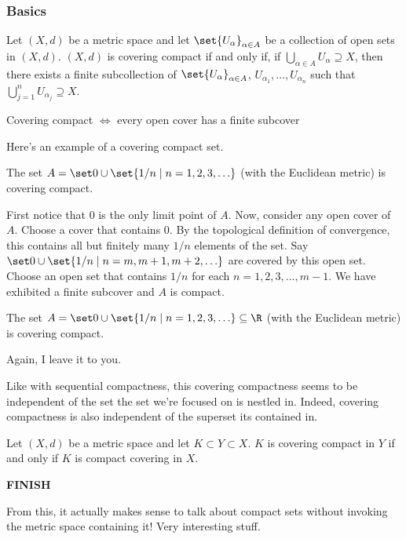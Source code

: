 \documentclass[class=article, crop=false]{standalone}
\begin{document}
\subsubsection*{Basics}

\begin{defn}
    Let $(X,d)$ be a metric space and let $\set{U_\alpha}_{\alpha \in A}$ be a collection of open sets in $(X,d)$. $(X,d)$ is covering compact if and only if, if $\bigcup_{\alpha \in A}^{} U_\alpha \supseteq X$, then there exists a finite subcollection of $\set{U_\alpha}_{\alpha \in A}$, $U_{\alpha_1}, \ldots, U_{\alpha_n}$ such that $\bigcup_{j=1}^{n} U_{\alpha_j} \supseteq X$.
\end{defn}
\begin{slogan}
    Covering compact $\iff$ every open cover has a finite subcover
\end{slogan}

Here's an example of a covering compact set.
\begin{ex}
    The set $A = \set 0 \cup \set{1/n \mid n=1,2,3,\ldots}$ (with the Euclidean metric) is covering compact.
\end{ex}
\begin{pf}
    First notice that $0$ is the only limit point of $A$. Now, consider any open cover of $A$. Choose a cover that contains 0. By the topological definition of convergence, this contains all but finitely many $1/n$ elements of the set. Say $\set 0 \cup \set{1/n \mid n=m,m+1,m+2,\ldots}$ are covered by this open set. Choose an open set that contains $1/n$ for each $n=1,2,3,\ldots,m-1$. We have exhibited a finite subcover and $A$ is compact.
\end{pf}

\begin{ex}
    The set $A = \set 0 \cup \set{1/n \mid n=1,2,3,\ldots} \subseteq \R$ (with the Euclidean metric) is covering compact.
\end{ex}
\begin{pf}
    Again, I leave it to you.
\end{pf}
Like with sequential compactness, this covering compactness seems to be independent of the set the set we're focused on is nestled in. Indeed, covering compactness is also independent of the superset its contained in.
\begin{thm}
    Let $(X,d)$ be a metric space and let $K \subset Y \subset X$. $K$ is covering compact in $Y$ if and only if $K$ is compact covering in $X$.
\end{thm}
\begin{pf}
    \textbf{FINISH}
\end{pf}
\begin{rem}
    From this, it actually makes sense to talk about compact sets without invoking the metric space containing it! Very interesting stuff.
\end{rem}
\end{document}
